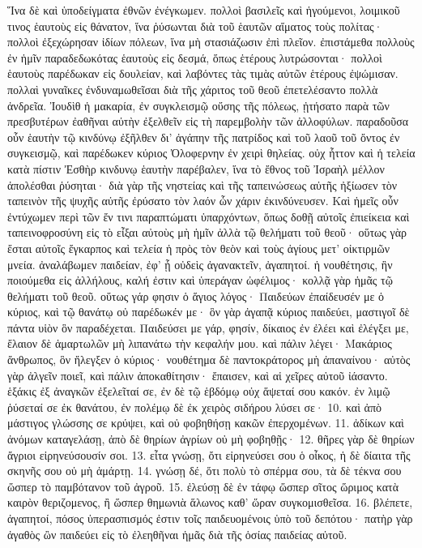 Ἵνα δὲ καὶ ὑποδείγματα ἐθνῶν ἐνέγκωμεν. πολλοὶ βασιλεῖς καὶ ἡγούμενοι, λοιμικοῦ τινος ἑαυτοὺς εἰς θάνατον, ἵνα ῥύσωνται διὰ τοῦ ἑαυτῶν αἵματος τοὺς πολίτας· πολλοὶ ἐξεχώρησαν ἰδίων πόλεων, ἵνα μὴ στασιάζωσιν ἐπὶ πλεῖον. ἐπιστάμεθα πολλοὺς ἐν ἡμῖν παραδεδωκότας ἑαυτοὺς εἰς δεσμά, ὅπως ἑτέρους λυτρώσονται· πολλοὶ ἑαυτοὺς παρέδωκαν εἰς δουλείαν, καὶ λαβόντες τὰς τιμὰς αὐτῶν ἑτέρους ἐψώμισαν. πολλαὶ γυναῖκες ἐνδυναμωθεῖσαι διὰ τῆς χάριτος τοῦ θεοῦ ἐπετελέσαντο πολλὰ ἀνδρεῖα. Ἰουδὶθ ἡ μακαρία, ἐν συγκλεισμῷ οὔσης τῆς πόλεως, ᾐτήσατο παρὰ τῶν πρεσβυτέρων ἐαθῆναι αὐτὴν ἐξελθεῖν εἰς τὴ παρεμβολὴν τῶν ἀλλοφύλων. παραδοῦσα οὖν ἑαυτὴν τῷ κινδύνῳ ἐξῆλθεν δι’ ἀγάπην τῆς πατρίδος καὶ τοῦ λαοῦ τοῦ ὄντος ἐν συγκεισμῷ, καὶ παρέδωκεν κύριος Ὀλοφερνην ἐν χειρὶ θηλείας. οὐχ ἧττον καὶ ἡ τελεία κατὰ πίστιν Ἐσθὴρ κινδυνῳ ἑαυτὴν παρέβαλεν, ἵνα τὸ ἔθνος τοῦ Ἰσραὴλ μέλλον ἀπολέσθαι ῥύσηται· διὰ γὰρ τῆς νηστείας καὶ τῆς ταπεινώσεως αὐτῆς ἠξίωσεν τὸν ταπεινὸν τῆς ψυχῆς αὐτῆς ἐρύσατο τὸν λαόν ὧν χάριν ἐκινδύνευσεν.
Καὶ ἡμεῖς οὖν ἐντύχωμεν περὶ τῶν ἔν τινι παραπτώματι ὑπαρχόντων, ὅπως δοθῇ αὐτοῖς ἐπιείκεια καὶ ταπεινοφροσύνη εἰς τὸ εἶξαι αὐτοὺς μὴ ἡμῖν ἀλλὰ τῷ θελήματι τοῦ θεοῦ· οὕτως γὰρ ἔσται αὐτοῖς ἔγκαρπος καὶ τελεία ἡ πρὸς τὸν θεὸν καὶ τοὺς ἁγίους μετ’ οἰκτιρμῶν μνεία. ἀναλάβωμεν παιδείαν, ἐφ’ ᾗ οὐδεὶς ἀγανακτεῖν, ἀγαπητοί. ἡ νουθέτησις, ἣν ποιούμεθα εἰς ἀλλήλους, καλή ἐστιν καὶ ὑπεράγαν ὠφέλιμος· κολλᾷ γὰρ ἡμᾶς τῷ θελήματι τοῦ θεοῦ. οὕτως γάρ φησιν ὁ ἅγιος λόγος· Παιδεύων ἐπαίδευσέν με ὁ κύριος, καὶ τῷ θανάτῳ οὐ παρέδωκέν με· ὃν γὰρ ἀγαπᾷ κύριος παιδεύει, μαστιγοῖ δὲ πάντα υἱὸν ὃν παραδέχεται. Παιδεύσει με γάρ, φησίν, δίκαιος ἐν ἐλέει καὶ ἐλέγξει με, ἔλαιον δὲ ἁμαρτωλῶν μὴ λιπανάτω τὴν κεφαλήν μου. καὶ πάλιν λέγει· Μακάριος ἄνθρωπος, ὃν ἤλεγξεν ὁ κύριος· νουθέτημα δὲ παντοκράτορος μὴ ἀπαναίνου· αὐτὸς γὰρ ἀλγεῖν ποιεῖ, καὶ πάλιν ἀποκαθίτησιν· ἔπαισεν, καὶ αἱ χεῖρες αὐτοῦ ἰάσαντο. ἑξάκις ἐξ ἀναγκῶν ἐξελεῖταί σε, ἐν δὲ τῷ ἑβδόμῳ οὐχ ἅψεταί σου κακόν. ἐν λιμῷ ῥύσεταί σε ἐκ θανάτου, ἐν πολέμῳ δὲ ἐκ χειρὸς σιδήρου λύσει σε· 10. καὶ ἀπὸ μάστιγος γλώσσης σε κρύψει, καὶ οὐ φοβηθήσῃ κακῶν ἐπερχομένων. 11. ἀδίκων καὶ ἀνόμων καταγελάσῃ, ἀπὸ δὲ θηρίων ἀγρίων οὐ μὴ φοβηθῇς· 12. θῆρες γὰρ δὲ θηρίων ἄγριοι εἰρηνεύσουσίν σοι. 13. εἶτα γνώσῃ, ὄτι εἰρηνεύσει σου ὁ οἶκος, ἡ δὲ δίαιτα τῆς σκηνῆς σου οὐ μὴ ἁμάρτῃ. 14. γνώσῃ δέ, ὅτι πολὺ τὸ σπέρμα σου, τὰ δὲ τέκνα σου ὥσπερ τὸ παμβότανον τοῦ ἀγροῦ. 15. ἐλεύσῃ δὲ ἐν τάφῳ ὥσπερ σῖτος ὥριμος κατὰ καιρὸν θεριζομενος, ἢ ὥσπερ θημωνιὰ ἅλωνος καθ’ ὥραν συγκομισθεῖσα. 16. βλέπετε, ἀγαπητοί, πόσος ὑπερασπισμός ἐστιν τοῖς παιδευομένοις ὑπὸ τοῦ δεπότου· πατὴρ γὰρ ἀγαθὸς ὢν παιδεύει εἰς τὸ ἐλεηθῆναι ἡμᾶς διὰ τῆς ὁσίας παιδείας αὐτοῦ.
